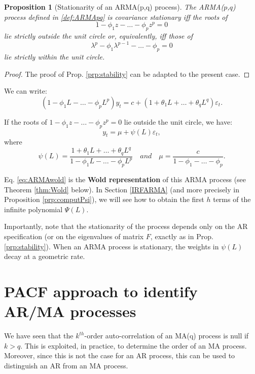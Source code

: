 \documentclass[
  12pt,
]{book}
\newtheorem{proposition}{Proposition}[chapter]
\theoremstyle{definition}
\theoremstyle{definition}
\theoremstyle{definition}
\theoremstyle{definition}
\theoremstyle{remark}
\begin{document}
\begin{proposition}[Stationarity of an ARMA(p,q) process]
\protect\hypertarget{prp:statioARMApq}{}\label{prp:statioARMApq}The ARMA(\(p\),\(q\)) process defined in \ref{def:ARMApq} is covariance stationary iff the roots of
\[
1 - \phi_1 z - \dots - \phi_p z^p=0
\]
lie strictly outside the unit circle or, equivalently, iff those of
\[
\lambda^p - \phi_1 \lambda^{p-1} - \dots - \phi_p=0
\]
lie strictly within the unit circle.
\end{proposition}

\begin{proof}
The proof of Prop. \ref{prp:stability} can be adapted to the present case.
\end{proof}

We can write:
\[
(1 - \phi_1 L - \dots - \phi_p L^p)y_t = c + (1 + \theta_1 L + \dots + \theta_q L^q)\varepsilon_t.
\]

If the roots of \(1 - \phi_1 z - \dots - \phi_p z^p=0\) lie outside the unit circle, we have:
\begin{equation}
y_t = \mu + \psi(L)\varepsilon_t,\label{eq:ARMAwold}
\end{equation}
where
\[
\psi(L) = \frac{1 + \theta_1 L + \dots + \theta_q L^q}{1 - \phi_1 L - \dots - \phi_p L^p} \quad and \quad \mu = \dfrac{c}{1-\phi_1 -\dots - \phi_p}.
\]

Eq. \eqref{eq:ARMAwold} is the \textbf{Wold representation} of this ARMA process (see Theorem \ref{thm:Wold} below). In Section \ref{IRFARMA} (and more precisely in Proposition \ref{prp:computPsi}), we will see how to obtain the first \(h\) terms of the infinite polynomial \(\Psi(L)\).

Importantly, note that the stationarity of the process depends only on the AR specification (or on the eigenvalues of matrix \(F\), exactly as in Prop. \ref{prp:stability}). When an ARMA process is stationary, the weights in \(\psi(L)\) decay at a geometric rate.

\hypertarget{PACFapproach}{%
\section{PACF approach to identify AR/MA processes}\label{PACFapproach}}

We have seen that the \(k^{th}\)-order auto-correlation of an MA(q) process is null if \(k>q\). This is exploited, in practice, to determine the order of an MA process. Moreover, since this is not the case for an AR process, this can be used to distinguish an AR from an MA process.
\end{document}

